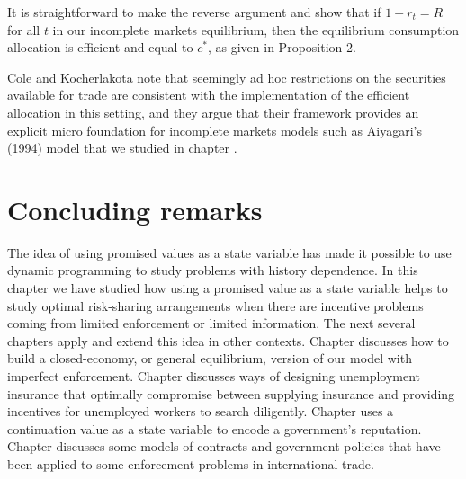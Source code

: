 It is straightforward to make the reverse argument and show that if
$1+r_t=R$ for all $t$ in our incomplete markets equilibrium, then the
equilibrium consumption allocation is efficient and equal to $c^*$,
as given in Proposition 2.

Cole and Kocherlakota note that seemingly  ad hoc restrictions on
the securities available for trade are consistent with the implementation of
the efficient allocation in this setting, and they argue that
their framework provides an explicit micro foundation for
incomplete markets models such as Aiyagari's (1994) model that we studied
in chapter .



\section{Concluding remarks}

  The idea of using promised values as a state variable has
made it possible to use dynamic programming  to study
problems with history dependence. In this chapter we have
studied how using a promised value as a state variable helps
to study optimal risk-sharing arrangements when there are incentive
problems coming from limited enforcement or limited information.  The next several
chapters apply and extend this idea in   other contexts.
Chapter  discusses how to build a closed-economy, or general equilibrium,
version of our model with imperfect enforcement.
Chapter  discusses ways of designing  unemployment insurance that optimally
compromise between supplying insurance and providing incentives for unemployed workers to  search diligently.
Chapter  uses a continuation value as a state variable to encode a government's
reputation.  Chapter
 discusses some models of contracts and government policies that have been applied to
some enforcement problems in international trade.








